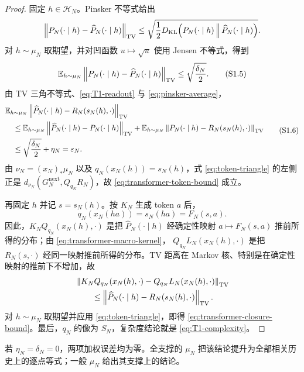 \begin{proof}
固定 $h\in\mathcal H_N$。Pinsker 不等式\citep{CoverThomas2006}给出
\[
 \left\|P_N(\cdot\mid h)-\widehat P_N(\cdot\mid h)\right\|_{\operatorname{TV}}
 \le
 \sqrt{\frac12
 D_{\mathrm{KL}}\!\left(
 P_N(\cdot\mid h)\,\middle\|\,
 \widehat P_N(\cdot\mid h)
 \right)}.
\]
对 $h\sim\mu_N$ 取期望，并对凹函数 $u\mapsto\sqrt u$ 使用 Jensen 不等式，得到
\[
 \mathbb E_{h\sim\mu_N}
 \left\|P_N(\cdot\mid h)-\widehat P_N(\cdot\mid h)\right\|_{\TV}
 \le\sqrt{\frac{\delta_N}{2}}.
 \tag{\TransformerEquationPrefix.5}\label{eq:pinsker-average}
\]
由 TV 三角不等式、\eqref{eq:T1-readout} 与
\eqref{eq:pinsker-average}，
\[
 \begin{aligned}
 &\mathbb E_{h\sim\mu_N}
 \left\|\widehat P_N(\cdot\mid h)
       -R_N(s_N(h),\cdot)\right\|_{\TV}\\
 &\quad\le
 \mathbb E_{h\sim\mu_N}
 \left\|\widehat P_N(\cdot\mid h)-P_N(\cdot\mid h)\right\|_{\TV}
 +\mathbb E_{h\sim\mu_N}
 \left\|P_N(\cdot\mid h)-R_N(s_N(h),\cdot)\right\|_{\TV}\\
 &\quad\le\sqrt{\frac{\delta_N}{2}}+\eta_N
 =\varepsilon_N.
 \end{aligned}
 \tag{\TransformerEquationPrefix.6}\label{eq:token-triangle}
\]
由 $\nu_N=(x_N)_*\mu_N$ 以及
$q_N(x_N(h))=s_N(h)$，式 \eqref{eq:token-triangle} 的左侧正是
$d_{\nu_N}(G_N^{\mathrm{next}},Q_{q_N}R_N)$，故
\eqref{eq:transformer-token-bound} 成立。

再固定 $h$ 并记 $s=s_N(h)$。按 $K_N$ 生成 token $a$ 后，
\[
 q_N(x_N(ha))=s_N(ha)=F_N(s,a).
\]
因此，$K_NQ_{q_N}(x_N(h),\cdot)$ 是把
$\widehat P_N(\cdot\mid h)$ 经确定性映射
$a\mapsto F_N(s,a)$ 推前所得的分布；由
\eqref{eq:transformer-macro-kernel}，
$Q_{q_N}L_N(x_N(h),\cdot)$ 是把
$R_N(s,\cdot)$ 经同一映射推前所得的分布。TV 距离在 Markov 核、特别是在确定性映射的推前下不增加，故
\[
 \begin{aligned}
 &\left\|K_NQ_{q_N}(x_N(h),\cdot)
       -Q_{q_N}L_N(x_N(h),\cdot)\right\|_{\operatorname{TV}}\\
 &\qquad\le
 \left\|\widehat P_N(\cdot\mid h)
       -R_N(s_N(h),\cdot)\right\|_{\operatorname{TV}}.
 \end{aligned}
\]
对 $h\sim\mu_N$ 取期望并应用 \eqref{eq:token-triangle}，即得
\eqref{eq:transformer-closure-bound}。最后，$q_N$ 的像为 $S_N$，复杂度结论就是 \eqref{eq:T1-complexity}。
\end{proof}

\begin{remark}[精确情形]
若 $\eta_N=\delta_N=0$，两项加权误差均为零。全支撑的 $\mu_N$ 把该结论提升为全部相关历史上的逐点等式；一般 $\mu_N$ 给出其支撑上的结论。
\end{remark}

